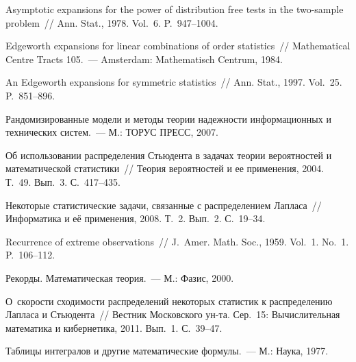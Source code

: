 \begin{multicols}{2}
{{\begin{thebibliography}{99}
 Asymptotic expansions for the
power of distribution free tests in the two-sample problem~// Ann.
Stat., 1978. Vol.~6. P.~947--1004.

 Edgeworth   expansions for linear combinations
of order statistics~// Mathematical Centre Tracts 105.~--- Amsterdam:
Mathematisch Centrum, 1984.

 An Edgeworth
expansions for symmetric statistics~// Ann. Stat., 1997. Vol.~25.
P.~851--896.

Рандомизированные модели и методы теории надежности информационных и
технических систем.~--- М.: ТОРУС ПРЕСС, 2007.

 Об использовании распределения
Стьюдента в задачах теории вероятностей и математической статистики~// 
Теория вероятностей и ее применения, 2004. Т.~49. Вып.~3. С.~417--435.

 Некоторые статистические задачи,
связанные с распределением Лапласа~// Информатика и её применения,
2008. Т.~2. Вып.~2. С.~19--34.

 Recurrence of extreme observations~// J.~Amer. Math. Soc., 
1959. Vol.~1. No.~1. P.~106--112.

 Рекорды. Математическая теория.~--- М.: Фазис, 2000.

 О~скорости сходимости распределений некоторых
статистик к распределению Лапласа и Стьюдента~// Вестник Московского
ун-та. Сер.~15: Вычислительная  математика и кибернетика,
2011. Вып.~1. С.~39--47.

\label{end\stat}


Таблицы интегралов и другие математические формулы.~--- М.: Наука, 1977.
\end{thebibliography}
}
}

\end{multicols}